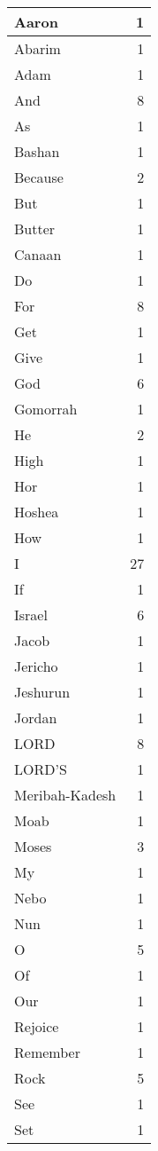 \begin{center}
\begin{longtable}{l|r}
\hline \hline
\endlastfoot
Aaron & 1 \\ \hline
Abarim & 1 \\ \hline
Adam & 1 \\ \hline
And & 8 \\ \hline
As & 1 \\ \hline
Bashan & 1 \\ \hline
Because & 2 \\ \hline
But & 1 \\ \hline
Butter & 1 \\ \hline
Canaan & 1 \\ \hline
Do & 1 \\ \hline
For & 8 \\ \hline
Get & 1 \\ \hline
Give & 1 \\ \hline
God & 6 \\ \hline
Gomorrah & 1 \\ \hline
He & 2 \\ \hline
High & 1 \\ \hline
Hor & 1 \\ \hline
Hoshea & 1 \\ \hline
How & 1 \\ \hline
I & 27 \\ \hline
If & 1 \\ \hline
Israel & 6 \\ \hline
Jacob & 1 \\ \hline
Jericho & 1 \\ \hline
Jeshurun & 1 \\ \hline
Jordan & 1 \\ \hline
LORD & 8 \\ \hline
LORD'S & 1 \\ \hline
Meribah-Kadesh & 1 \\ \hline
Moab & 1 \\ \hline
Moses & 3 \\ \hline
My & 1 \\ \hline
Nebo & 1 \\ \hline
Nun & 1 \\ \hline
O & 5 \\ \hline
Of & 1 \\ \hline
Our & 1 \\ \hline
Rejoice & 1 \\ \hline
Remember & 1 \\ \hline
Rock & 5 \\ \hline
See & 1 \\ \hline
Set & 1 \\ \hline

\end{longtable}
\end{center}
